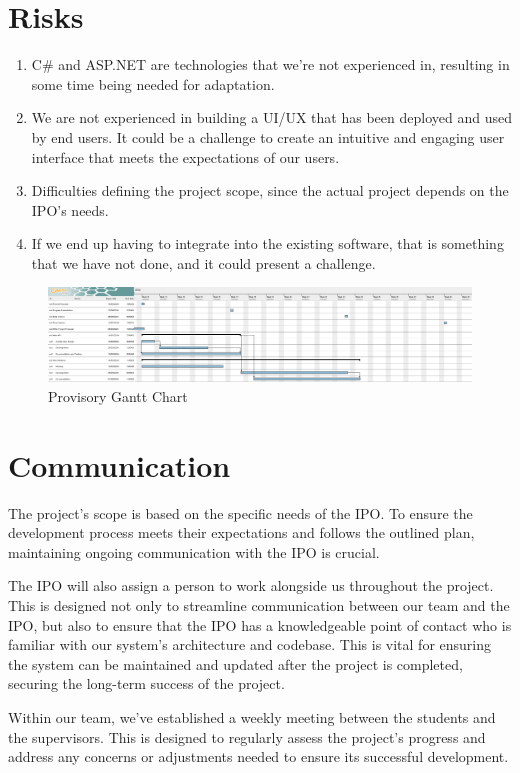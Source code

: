 \documentclass[a4paper,11pt]{article}
\begin{document}
\section{Risks}
\begin{enumerate}
	\item C\# \cite{csharp} and ASP.NET are technologies that we’re not experienced in, resulting in some time being needed for adaptation.

	\item We are not experienced in building a UI/UX that has been deployed and used by end users. It could be a challenge to create an intuitive and engaging user interface that meets the expectations of our users.

	\item Difficulties defining the project scope, since the actual project depends on the IPO's needs.

	\item If we end up having to integrate into the existing software, that is something that we have not done, and it could present a challenge.
\end{enumerate}

\begin{figure}[h]
\centering
\includegraphics[width=\textwidth,height=\textheight,keepaspectratio]{gantt.png}
\caption{Provisory Gantt Chart}
\end{figure}

\section{Communication}
The project's scope is based on the specific needs of the IPO. To ensure the development process meets their expectations and follows the outlined plan, maintaining ongoing communication with the IPO is crucial.

The IPO will also assign a person to work alongside us throughout the project. This is designed not only to streamline communication between our team and the IPO, but also to ensure that the IPO has a knowledgeable point of contact who is familiar with our system's architecture and codebase. This is vital for ensuring the system can be maintained and updated after the project is completed, securing the long-term success of the project.

Within our team, we've established a weekly meeting between the students and the supervisors. This is designed to regularly assess the project's progress and address any concerns or adjustments needed to ensure its successful development.

\printbibliography[heading=bibintoc]
\end{document}
